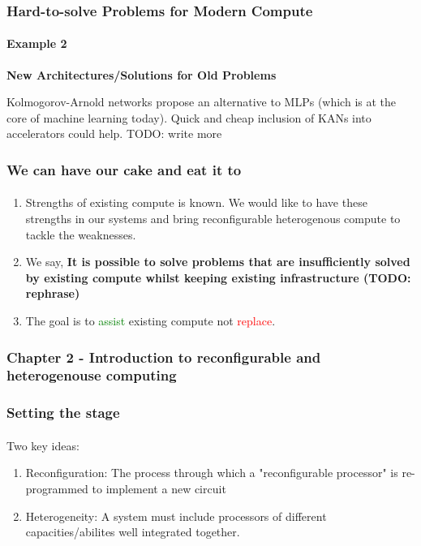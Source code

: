 \documentclass{beamer}
\begin{document}
\begin{frame}[fragile]
  \frametitle{Hard-to-solve Problems for Modern Compute}
  \framesubtitle{Example 2}
  \textbf{New Architectures/Solutions for Old Problems}

  Kolmogorov-Arnold networks propose an alternative to MLPs (which is
  at the core of machine learning today). Quick and cheap inclusion of KANs into
  accelerators could help. TODO: write more

\end{frame}

\begin{frame}[fragile]
  \frametitle{We can have our cake and eat it to}
  \framesubtitle{}
      \begin{enumerate}
        \item Strengths of existing compute is known. We would like
          to have these strengths in our systems and bring reconfigurable
          heterogenous compute to tackle the weaknesses. 
        \item We say, \textbf{It is possible to solve problems that are
          insufficiently solved by existing compute whilst keeping existing
          infrastructure (TODO: rephrase)}
        \item The goal is to \textcolor{green}{assist} existing compute not
          \textcolor{red}{replace}.
      \end{enumerate}
\end{frame}

\begin{frame}[fragile]
\frametitle{Chapter 2 - Introduction to reconfigurable and heterogenouse computing}

\end{frame}

\begin{frame}[fragile]
  \frametitle{Setting the stage}
  \framesubtitle{}
    Two key ideas:
      \begin{enumerate}
        \item Reconfiguration: The process through which a "reconfigurable
      processor" is re-programmed to implement a new circuit
        \item Heterogeneity: A system must include processors of different 
          capacities/abilites well integrated together.
      \end{enumerate}
\end{frame}
\end{document}

